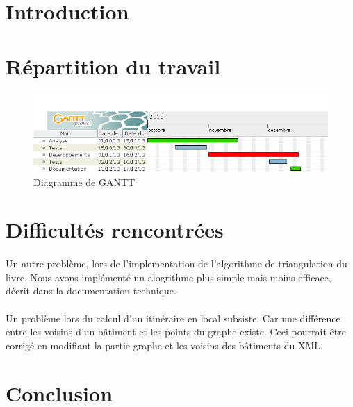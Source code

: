 \documentclass[12pt,a4paper,oneside]{article}
\begin{document}
\newpage

\tableofcontents
\newpage

\section{Introduction}



\section{Répartition du travail}


\begin{figure}[H]

\centering
\includegraphics[width=1\textwidth]{../images/gantt.png}
\caption{Diagramme de GANTT}

\end{figure}

\section{Difficultés rencontrées}



\paragraph{}
Un autre problème, lors de l'implementation de l'algorithme de triangulation du livre.
Nous avons implémenté un alogrithme plus simple mais moins efficace, décrit dans la documentation technique.

\paragraph{}
Un problème lors du calcul d'un itinéraire en local subsiste.
Car une différence entre les voisins d'un bâtiment et les points du graphe existe.
Ceci pourrait être corrigé en modifiant la partie graphe et les voisins des bâtiments du XML.

\section{Conclusion}
\end{document}

